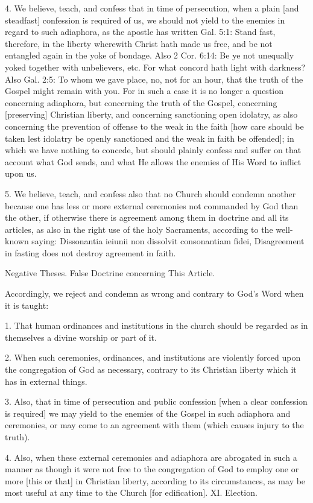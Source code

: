 4. We believe, teach, and confess that in time of persecution, when a plain [and steadfast] confession is required of us, we should not yield to the enemies in regard to such adiaphora, as the apostle has written Gal. 5:1: Stand fast, therefore, in the liberty wherewith Christ hath made us free, and be not entangled again in the yoke of bondage. Also 2 Cor. 6:14: Be ye not unequally yoked together with unbelievers, etc. For what concord hath light with darkness? Also Gal. 2:5: To whom we gave place, no, not for an hour, that the truth of the Gospel might remain with you. For in such a case it is no longer a question concerning adiaphora, but concerning the truth of the Gospel, concerning [preserving] Christian liberty, and concerning sanctioning open idolatry, as also concerning the prevention of offense to the weak in the faith [how care should be taken lest idolatry be openly sanctioned and the weak in faith be offended]; in which we have nothing to concede, but should plainly confess and suffer on that account what God sends, and what He allows the enemies of His Word to inflict upon us.

5. We believe, teach, and confess also that no Church should condemn another because one has less or more external ceremonies not commanded by God than the other, if otherwise there is agreement among them in doctrine and all its articles, as also in the right use of the holy Sacraments, according to the well-known saying: Dissonantia ieiunii non dissolvit consonantiam fidei, Disagreement in fasting does not destroy agreement in faith.

Negative Theses.
False Doctrine concerning This Article.

Accordingly, we reject and condemn as wrong and contrary to God's Word when it is taught:

1. That human ordinances and institutions in the church should be regarded as in themselves a divine worship or part of it.

2. When such ceremonies, ordinances, and institutions are violently forced upon the congregation of God as necessary, contrary to its Christian liberty which it has in external things.

3. Also, that in time of persecution and public confession [when a clear confession is required] we may yield to the enemies of the Gospel in such adiaphora and ceremonies, or may come to an agreement with them (which causes injury to the truth).

4. Also, when these external ceremonies and adiaphora are abrogated in such a manner as though it were not free to the congregation of God to employ one or more [this or that] in Christian liberty, according to its circumstances, as may be most useful at any time to the Church [for edification].
XI. Election.

